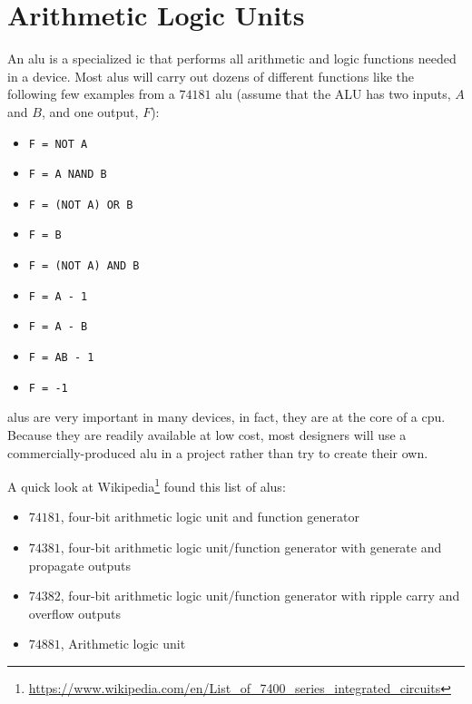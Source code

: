 \section{Arithmetic Logic Units}
\label{CL:sec:arithmetic_and_logic_units}

An \gls{alu} is a specialized \gls{ic} that performs all arithmetic and logic functions needed in a device. Most \glspl{alu} will carry out dozens of different functions like the following few examples from a $ 74181 $ \gls{alu} (assume that the ALU has two inputs, $ A $ and $ B $, and one output, $ F $):

\begin{itemize}
  \item \lstinline[columns=fixed]|F = NOT A|
  \item \lstinline[columns=fixed]|F = A NAND B|
  \item \lstinline[columns=fixed]|F = (NOT A) OR B|
  \item \lstinline[columns=fixed]|F = B|
  \item \lstinline[columns=fixed]|F = (NOT A) AND B|
  \item \lstinline[columns=fixed]|F = A - 1|
  \item \lstinline[columns=fixed]|F = A - B|
  \item \lstinline[columns=fixed]|F = AB - 1|
  \item \lstinline[columns=fixed]|F = -1|
\end{itemize}

\glspl{alu} are very important in many devices, in fact, they are at the core of a \gls{cpu}. Because they are readily available at low cost, most designers will use a commercially-produced \gls{alu} in a project rather than try to create their own.

A quick look at Wikipedia\footnote{\url{https://www.wikipedia.com/en/List_of_7400_series_integrated_circuits}} found this list of \glspl{alu}:

\begin{itemize}
  \item $ 74181 $, four-bit arithmetic logic unit and function generator
  \item $ 74381 $, four-bit arithmetic logic unit/function generator with generate and propagate outputs
  \item $ 74382 $, four-bit arithmetic logic unit/function generator with ripple carry and overflow outputs
  \item $ 74881 $, Arithmetic logic unit
\end{itemize}

